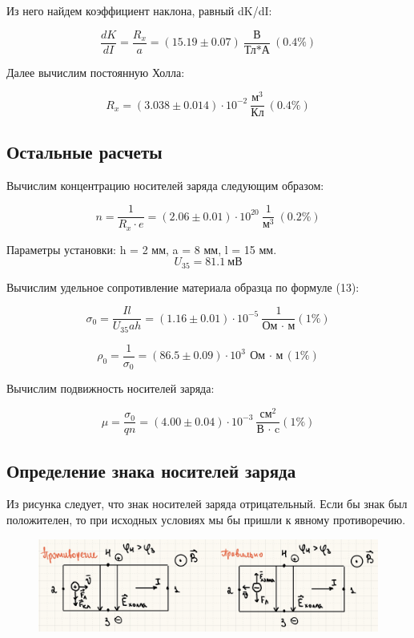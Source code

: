 Из него найдем коэффициент наклона, равный dK/dI:

$$
    \frac{dK}{dI} = \frac{R_x}{a}= (15.19
 \pm 0.07)  \ \frac{\text{В}}{\text{Тл*А}} \ (0.4 \%)
$$

Далее вычислим постоянную Холла:

$$
    R_x = (3.038 \pm 0.014) \cdot 10^{-2}  \ \frac{\text{м}^3}{\text{Кл}} \ (0.4\%)
$$

\subsection{Остальные расчеты}

Вычислим концентрацию носителей заряда следующим образом:

$$
    n = \frac{1}{R_x \cdot e} = (2.06 \pm 0.01) \cdot 10^{20} \ \frac{1}{\text{м}^3} \ (0.2\%)
$$


Параметры установки: h = 2 мм, a = 8 мм, l = 15 мм.
$$
    U_{35} = 81.1 \ \text{мВ}
$$

Вычислим удельное сопротивление материала образца по формуле (13):

$$
    \sigma_0 = \frac{Il}{U_{35} a h} = (1.16 \pm 0.01) \cdot 10^{-5}\ \frac{\text{1}}{\text{Ом $\cdot$ м}} (1 \%)
$$

$$
    \rho_0 = \frac{1}{\sigma_0} = (86.5 \pm 0.09) \cdot 10^{3} \ \text{Ом $\cdot$ м} (1 \%)
$$

Вычислим подвижность носителей заряда:

$$
    \mu = \frac{\sigma_0}{qn} = (4.00 \pm 0.04) \cdot 10^{-3} \ \frac{\text{см}^2}{\text{В $\cdot$ c}} (1 \%)
$$

\subsection{Определение знака носителей заряда}

Из рисунка следует, что знак носителей заряда отрицательный. Если бы знак был положителен, то при исходных условиях мы бы пришли к явному противоречию.

\begin{figure}[H]
    \centering
    \includegraphics[width=1\textwidth]{pictures/LAST.jpg}
\end{figure} 


    

